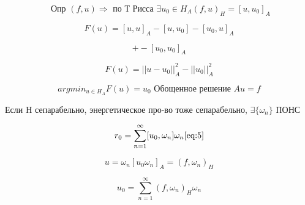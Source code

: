 \documentclass[12pt, a4paper]{article}
\begin{document}
\[ \textrm{ Опр } (f, u) \Rightarrow \textrm{ по Т Рисса } \exists u_0\in H_A (f, u)_H = [u, u_0]_A \]

\[ F(u) = [u, u]_A - [u, u_0] - [u_0, u]_A \]

\[ +-[u_0, u_0]_A \label{eq:4}\]

\[ F(u) = || u - u_0 ||^2_A - ||u_0||^2_A  \]

\[ argmin_{u \in H_A} F(u) = u_0 \textrm{ Обощенное решение } Au = f \]

Если H сепарабельно, энергетическое про-во тоже сепарабельно, $ \exists \{ \omega_n \} $ ПОНС

\[ r_0 = \sum_{n=1}^{\infty} [u_0, \omega_n] \omega_n  \ref{eq:5}\]

\[ u = \omega_n [u_0 \omega_n]_A = (f, \omega_n)_H \]

\[ u_0 = \sum_{n=1}^{\infty} (f, \omega_n)_H \omega_n \]
\end{document}
